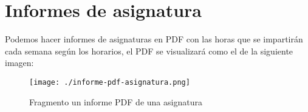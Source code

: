 \section{Informes de asignatura}
 
Podemos hacer informes de asignaturas en PDF con las horas que se impartirán cada semana según los horarios, el PDF se visualizará como el de la siguiente imagen:

\begin{figure}[H] 
  \label{informes-asignatura} 
	\begin{center}
    \texttt{[image: ./informe-pdf-asignatura.png]}
  \end{center}
\caption{Fragmento un informe PDF de una asignatura}
\end{figure}
